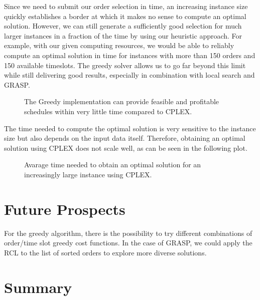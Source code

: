 \documentclass{article}
\begin{document}
Since we need to submit our order selection in time, an increasing instance size quickly establishes a border at which it makes no sense to compute an optimal solution. However, we can still generate a sufficiently good selection for much larger instances in a fraction of the time by using our heuristic approach. For example, with our given computing resources, we would be able to reliably compute an optimal solution in time for instances with more than 150 orders and 150 available timeslots. The greedy solver allows us to go far beyond this limit while still delivering good results, especially in combination with local search and GRASP.
\begin{figure}[H]
\centering

\caption[Greedy on very big Instances]{The Greedy implementation can provide feasible and profitable schedules within very little time compared to CPLEX.}
\label{fig:grasp_time}
\end{figure}
\newpage
The time needed to compute the optimal solution is very sensitive to the instance size but also depends on the input data itself. Therefore, obtaining an optimal solution using CPLEX does not scale well, as can be seen in the following plot.
\begin{figure}[H]
        \centering
        
        \caption[Time for solving the ILP]{Avarage time needed to obtain an optimal solution for an increasingly large instance using CPLEX.}
        \label{fig:timecplex}
\end{figure}


\section{Future Prospects}
For the greedy algorithm, there is the possibility to try different combinations of order/time slot greedy cost functions.
In the case of GRASP, we could apply the RCL to the list of sorted orders to explore more diverse solutions.

\section{Summary}
\end{document}
